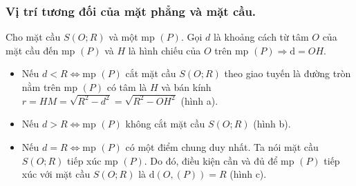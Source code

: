 \subsubsection{Vị trí tương đối của mặt phẳng và mặt cầu.}
Cho mặt cầu $S(O;R)$ và một mp $(P)$. Gọi $d$ là khoảng cách từ tâm $O$ của mặt cầu đến mp $(P)$ và $H$ là hình chiếu của $O$ trên mp $(P)\Rightarrow \mathrm{d}=OH$.
\begin{itemize}
	\item Nếu $d<R\Leftrightarrow \text{mp }(P)$ cắt mặt cầu $S(O;R)$ theo giao tuyến là đường tròn nằm trên mp $(P)$ có tâm là $H$ và bán kính $r=HM=\sqrt{R^2-d^2}=\sqrt{R^2-OH^2}$ (hình a).
	\item Nếu $d>R\Leftrightarrow \text{mp }(P)$ không cắt mặt cầu $S(O;R)$ (hình b).
	\item Nếu $d=R\Leftrightarrow \text{mp }(P)$ có một điểm chung duy nhất. Ta nói mặt cầu $S(O;R)$ tiếp xúc mp $(P)$. Do đó, điều kiện cần và đủ để mp $(P)$ tiếp xúc với mặt cầu $S(O;R)$ là $\mathrm{d}\left(O,(P)\right)=R$ (hình c).
\end{itemize}
